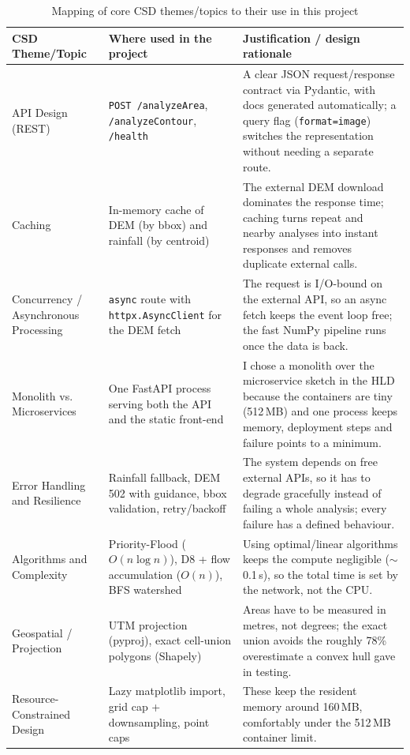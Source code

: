 \documentclass[manuscript,screen]{acmart}
\begin{document}
\begin{table}[t]
  \caption{Mapping of core CSD themes/topics to their use in this project}
  \label{tab:csd-themes}
  \begin{tabular}{p{2.8cm}p{5.2cm}p{6.5cm}}
    \toprule
    CSD Theme/Topic & Where used in the project & Justification / design rationale \\
    \midrule
    API Design (REST) & \texttt{POST /analyzeArea}, \texttt{/analyzeContour}, \texttt{/health} & A clear JSON request/response contract via Pydantic, with docs generated automatically; a query flag (\texttt{format=image}) switches the representation without needing a separate route. \\
    Caching & In-memory cache of DEM (by bbox) and rainfall (by centroid) & The external DEM download dominates the response time; caching turns repeat and nearby analyses into instant responses and removes duplicate external calls. \\
    Concurrency / Asynchronous Processing & \texttt{async} route with \texttt{httpx.AsyncClient} for the DEM fetch & The request is I/O-bound on the external API, so an async fetch keeps the event loop free; the fast NumPy pipeline runs once the data is back. \\
    Monolith vs. Microservices & One FastAPI process serving both the API and the static front-end & I chose a monolith over the microservice sketch in the HLD because the containers are tiny (512\,MB) and one process keeps memory, deployment steps and failure points to a minimum. \\
    Error Handling and Resilience & Rainfall fallback, DEM 502 with guidance, bbox validation, retry/backoff & The system depends on free external APIs, so it has to degrade gracefully instead of failing a whole analysis; every failure has a defined behaviour. \\
    Algorithms and Complexity & Priority-Flood ($O(n\log n)$), D8 + flow accumulation ($O(n)$), BFS watershed & Using optimal/linear algorithms keeps the compute negligible ($\sim$0.1\,s), so the total time is set by the network, not the CPU. \\
    Geospatial / Projection & UTM projection (pyproj), exact cell-union polygons (Shapely) & Areas have to be measured in metres, not degrees; the exact union avoids the roughly 78\% overestimate a convex hull gave in testing. \\
    Resource-Constrained Design & Lazy matplotlib import, grid cap + downsampling, point caps & These keep the resident memory around 160\,MB, comfortably under the 512\,MB container limit. \\

\end{tabular}
\end{table}
\end{document}
